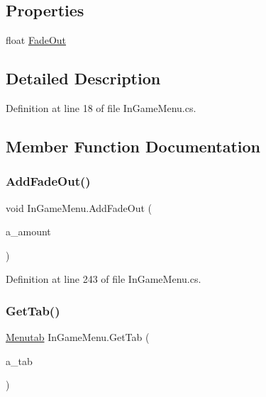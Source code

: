 \subsection*{Properties}
\begin{DoxyCompactItemize}
\item 
float \mbox{\hyperlink{class_in_game_menu_aad9dd59135a6647480d316fd8abc7350}{Fade\+Out}}
\end{DoxyCompactItemize}


\subsection{Detailed Description}


Definition at line 18 of file In\+Game\+Menu.\+cs.



\subsection{Member Function Documentation}
\mbox{\label{class_in_game_menu_a816006f1832391a119ab3e7626b45ec4}} 
\subsubsection{\texorpdfstring{Add\+Fade\+Out()}{AddFadeOut()}}
{\footnotesize\ttfamily void In\+Game\+Menu.\+Add\+Fade\+Out (\begin{DoxyParamCaption}\item[{float}]{a\+\_\+amount }\end{DoxyParamCaption})}



Definition at line 243 of file In\+Game\+Menu.\+cs.

\mbox{\label{class_in_game_menu_a47ad33d1d7eee44053bbe3488d39fb90}} 
\subsubsection{\texorpdfstring{Get\+Tab()}{GetTab()}\hspace{0.1cm}{\footnotesize\ttfamily [1/2]}}
{\footnotesize\ttfamily \mbox{\hyperlink{class_in_game_menu_1_1_menutab}{Menutab}} In\+Game\+Menu.\+Get\+Tab (\begin{DoxyParamCaption}\item[{Canvas\+Group}]{a\+\_\+tab }\end{DoxyParamCaption})}



